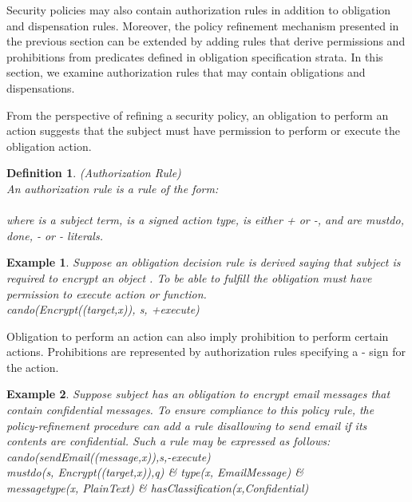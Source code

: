 \documentclass[12pt,journal,letterpaper,onecolumn]{IEEEtran}
\newtheorem{definition}{Definition}[section]
\newtheorem{example}{Example}[section]
\begin{document}
Security policies may also contain authorization rules in addition
to obligation and dispensation rules. Moreover, the policy
refinement mechanism presented in the previous section can be
extended by adding rules that derive permissions and prohibitions from
predicates defined in obligation specification strata. In this
section, we examine authorization rules that may contain obligations
and dispensations.

From the perspective of refining a security policy, an obligation to
perform an action suggests that the subject must have permission to
perform or execute the obligation action.

\begin{definition}(Authorization Rule)\\
An {\em authorization rule} is a rule of the form: \\
\indent \indent {}  \\
where  is a subject term,  is a signed action type,  is
either + or -, and  are {\ttfamily mustdo,
done}, - or - literals. \label{def:authorizationrule}
\end{definition}

\begin{example} Suppose an obligation decision rule is derived
saying that subject  is required to encrypt an object . To be
able to fulfill the obligation  must have permission to execute
 action or function. \\
{\ttfamily cando(Encrypt((target,x)), s, +execute)} \\
\indent \indent {}
\label{eg:derivecando}
\end{example}

Obligation to perform an action can also imply prohibition to
perform certain actions. Prohibitions are represented by
authorization rules specifying a - sign for the action.

\begin{example}
Suppose subject  has an obligation to encrypt email messages that
contain confidential messages. To ensure compliance to this policy
rule, the policy-refinement procedure can add a rule disallowing 
to send email if its contents are confidential. Such a rule may be
expressed as
follows:\\
{\ttfamily cando(sendEmail((message,x)),s,-execute)  \\
\indent\indent  mustdo(s, Encrypt((target,x)),q) \& type(x,
EmailMessage) \& \\
\indent\indent  messagetype(x, PlainText) \&
hasClassification(x,Confidential)} \label{eg:deriveprohibition}
\end{example}
\end{document}

